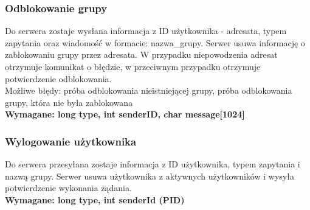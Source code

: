 \documentclass[11pt]{article}
\begin{document}
	\subsubsection{Odblokowanie grupy}
	Do serwera zostaje wysłana informacja z ID użytkownika - adresata, typem zapytania oraz wiadomość w formacie: nazwa\_grupy. Serwer usuwa informację o zablokowaniu grupy przez adresata. W przypadku niepowodzenia adresat otrzymuje komunikat o błędzie, w przeciwnym przypadku otrzymuje potwierdzenie odblokowania.\\
	Możliwe błędy: próba odblokowania nieistniejącej grupy, próba odblokowania grupy, która nie była zablokowana\\
	\textbf{Wymagane: long type, int senderID, char message[1024]}
	\subsubsection{Wylogowanie użytkownika}
	Do serwera przesyłana zostaje informacja z ID użytkownika, typem zapytania i nazwą grupy. Serwer usuwa użytkownika z aktywnych użytkowników i wysyła potwierdzenie wykonania żądania.\\
	\textbf{Wymagane: long type, int senderId (PID)}
	
\end{document}
